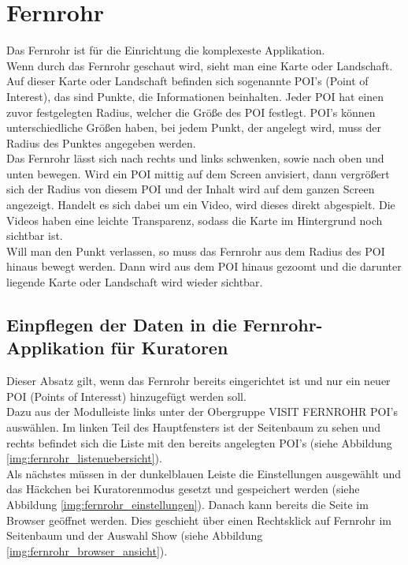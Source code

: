 \cleardoublepage


\section{Fernrohr}

Das Fernrohr ist für die Einrichtung die komplexeste Applikation.\\

Wenn durch das Fernrohr geschaut wird, sieht man eine Karte oder Landschaft. Auf dieser Karte oder Landschaft befinden sich sogenannte POI's (Point of Interest), das sind Punkte, die Informationen beinhalten. Jeder POI hat einen zuvor festgelegten Radius, welcher die Größe des POI festlegt. POI's können unterschiedliche Größen haben, bei jedem Punkt, der angelegt wird, muss der Radius des Punktes angegeben werden.\\

Das Fernrohr lässt sich nach rechts und links schwenken, sowie nach oben und unten bewegen. Wird ein POI mittig auf dem Screen anvisiert, dann vergrößert sich der Radius von diesem POI und der Inhalt wird auf dem ganzen Screen angezeigt. Handelt es sich dabei um ein Video, wird dieses direkt abgespielt. Die Videos haben eine leichte Transparenz, sodass die Karte im Hintergrund noch sichtbar ist.\\

Will man den Punkt verlassen, so muss das Fernrohr aus dem Radius des POI hinaus bewegt werden. Dann wird aus dem POI hinaus gezoomt und die darunter liegende Karte oder Landschaft wird wieder sichtbar. 

\subsection{Einpflegen der Daten in die Fernrohr-Applikation für Kuratoren}

Dieser Absatz gilt, wenn das Fernrohr bereits eingerichtet ist und nur ein neuer POI (Points of Interesst) hinzugefügt werden soll.\\

Dazu aus der Modulleiste links unter der Obergruppe VISIT FERNROHR POI's auswählen. Im linken Teil des Hauptfensters ist der Seitenbaum zu sehen und rechts befindet sich die Liste mit den bereits angelegten POI's (siehe Abbildung \ref{img:fernrohr_listenuebersicht}).\\

Als nächstes müssen in der dunkelblauen Leiste die \glqq Einstellungen\grqq{} ausgewählt und das Häckchen bei Kuratorenmodus gesetzt und gespeichert werden (siehe Abbildung \ref{img:fernrohr_einstellungen}). Danach kann bereits die Seite im Browser geöffnet werden. Dies geschieht über einen Rechtsklick auf \glqq Fernrohr\grqq{} im Seitenbaum und der Auswahl \glqq Show\grqq{} (siehe Abbildung \ref{img:fernrohr_browser_ansicht}). 



